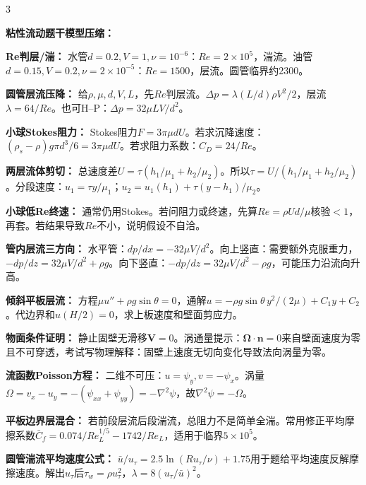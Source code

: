 \documentclass[a4paper]{article}
\newcommand{\sect}[1]{\par{\bfseries\color{Q}#1：}}
\begin{document}
\begin{multicols}{3}
{\sect{粘性流动题干模型压缩}
\sect{Re判层/湍}
水管$d=0.2,V=1,\nu=10^{-6}$：$Re=2\times10^5$，湍流。油管$d=0.15,V=0.2,\nu=2\times10^{-5}$：$Re=1500$，层流。圆管临界约2300。
\sect{圆管层流压降}
给$\rho,\mu,d,V,L$，先$Re$判层流。$\Delta p=\lambda(L/d)\rho V^2/2$，层流$\lambda=64/Re$。也可H--P：$\Delta p=32\mu LV/d^2$。
\sect{小球Stokes阻力}
Stokes阻力$F=3\pi\mu dU$。若求沉降速度：$(\rho_s-\rho)g\pi d^3/6=3\pi\mu dU$。若求阻力系数：$C_D=24/Re$。
\sect{两层流体剪切}
总速度差$U=\tau(h_1/\mu_1+h_2/\mu_2)$。所以$\tau=U/(h_1/\mu_1+h_2/\mu_2)$。分段速度：$u_1=\tau y/\mu_1$；$u_2=u_1(h_1)+\tau(y-h_1)/\mu_2$。
\sect{小球低Re终速}
通常仍用Stokes。若问阻力或终速，先算$Re=\rho Ud/\mu$核验$<1$，再套。若结果导致$Re$不小，说明假设不自洽。
\sect{管内层流三方向}
水平管：$dp/dx=-32\mu V/d^2$。向上竖直：需要额外克服重力，$-dp/dz=32\mu V/d^2+\rho g$。向下竖直：$-dp/dz=32\mu V/d^2-\rho g$，可能压力沿流向升高。
\sect{倾斜平板层流}
方程$\mu u''+\rho g\sin\theta=0$，通解$u=-\rho g\sin\theta\,y^2/(2\mu)+C_1y+C_2$。代边界和$u(H/2)=0$，求上板速度和壁面剪应力。
\sect{物面条件证明}
静止固壁无滑移$\bm V=0$。涡通量提示：$\bm\Omega\cdot\bm n=0$来自壁面速度为零且不可穿透，考试写物理解释：固壁上速度无切向变化导致法向涡量为零。
\sect{流函数Poisson方程}
二维不可压：$u=\psi_y,v=-\psi_x$。涡量$\Omega=v_x-u_y=-(\psi_{xx}+\psi_{yy})=-\nabla^2\psi$，故$\nabla^2\psi=-\Omega$。
\sect{平板边界层混合}
若前段层流后段湍流，总阻力不是简单全湍。常用修正平均摩擦系数$\bar C_f=0.074/Re_L^{1/5}-1742/Re_L$，适用于临界$5\times10^5$。
\sect{圆管湍流平均速度公式}
$\bar u/u_\tau=2.5\ln(Ru_\tau/\nu)+1.75$用于题给平均速度反解摩擦速度。解出$u_\tau$后$\tau_w=\rho u_\tau^2$，$\lambda=8(u_\tau/\bar u)^2$。

}
\end{multicols}
\end{document}
